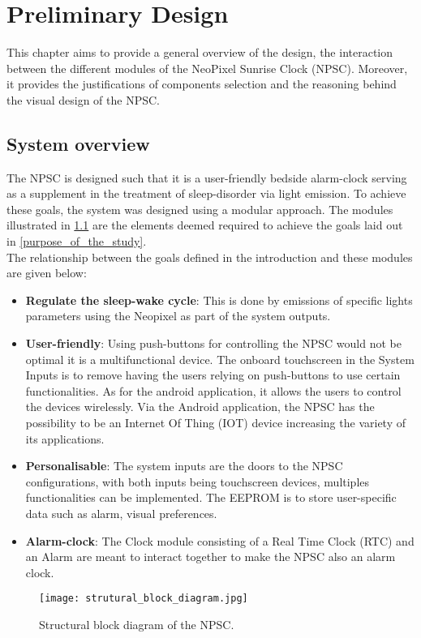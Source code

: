 \chapter{Preliminary Design}

This chapter aims to provide a general overview of the design, the interaction between the different modules of the NeoPixel Sunrise Clock (NPSC). Moreover, it provides the justifications of components selection and the reasoning behind the visual design of the NPSC.

\section{System overview}
The NPSC is designed such that it is a user-friendly bedside alarm-clock serving as a supplement in the treatment of sleep-disorder via light emission. To achieve these goals, the system was designed using a modular approach. The modules illustrated in  \cref{fig:strutural_block_diagram} are the elements deemed required to achieve the goals laid out in \ref{purpose_of_the_study}. \\
The relationship between the goals defined in the introduction and these modules are given below:
\begin{itemize}
\item \textbf{Regulate the sleep-wake cycle}: This is done by emissions of specific lights parameters using the Neopixel as part of the system outputs.
\item \textbf{User-friendly}: Using push-buttons for controlling the NPSC would not be optimal it is a multifunctional device. The onboard touchscreen in the System Inputs is to remove having the users relying on push-buttons to use certain functionalities. As for the android application, it allows the users to control the devices wirelessly. Via the Android application, the NPSC has the possibility to be an Internet Of Thing (IOT) device increasing the variety of its applications.
\item \textbf{Personalisable}: The system inputs are the doors to the NPSC configurations, with both inputs being touchscreen devices, multiples functionalities can be implemented. The EEPROM is to store user-specific data such as alarm, visual preferences.
\item \textbf{Alarm-clock}: The Clock module consisting of a Real Time Clock (RTC) and an Alarm are meant to interact together to make the NPSC also an alarm clock.
\end{itemize}
\begin{figure}[ht]
\centering
\texttt{[image: strutural\_block\_diagram.jpg]}
\caption{Structural block diagram of the NPSC.}
\label{fig:strutural_block_diagram}
\end{figure}


